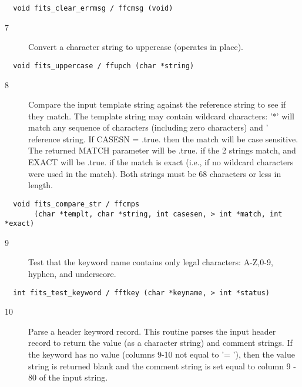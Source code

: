 \begin{verbatim}
  void fits_clear_errmsg / ffcmsg (void)
\end{verbatim}

\begin{description}
\item[7 ] Convert a character string to uppercase (operates in place).
\end{description}

\begin{verbatim}
  void fits_uppercase / ffupch (char *string)
\end{verbatim}

\begin{description}
\item[8 ]  Compare the input template string against the reference string
    to see if they match.  The template string may contain wildcard
    characters: '*' will match any sequence of characters (including
    zero characters) and '%
    reference string.  If CASESN = .true. then the match will be
    case sensitive.  The returned MATCH parameter will be .true. if
    the 2 strings match, and EXACT will be .true. if the match is
    exact (i.e., if no wildcard characters were used in the match).
   Both strings must be 68 characters or less in length.
\end{description}

\begin{verbatim}
  void fits_compare_str / ffcmps
       (char *templt, char *string, int casesen, > int *match, int *exact)
\end{verbatim}


\begin{description}
\item[9 ] Test that the keyword name contains only legal characters: A-Z,0-9,
   hyphen, and underscore.
\end{description}

\begin{verbatim}
  int fits_test_keyword / fftkey (char *keyname, > int *status)
\end{verbatim}

\begin{description}
\item[10] Parse a header keyword record.
    This routine parses the input header record to return the value (as
    a character string) and comment strings.  If the keyword has no
    value (columns 9-10 not equal to '= '), then the value string is returned
    blank and the comment string is set equal to column 9 - 80 of the
   input string.
\end{description}

